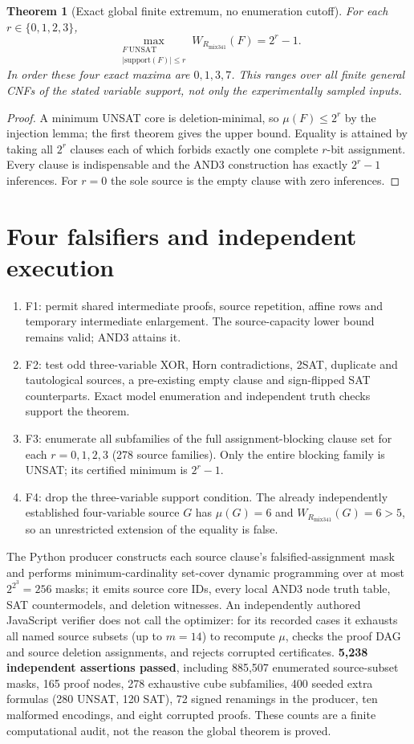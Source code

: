 \documentclass[11pt]{article}
\newtheorem{theorem}{Theorem}
\newcommand{\WR}{W_{R_{\mathrm{mix341}}}}
\begin{document}
\begin{theorem}[Exact global finite extremum, no enumeration cutoff]
For each $r\in\{0,1,2,3\}$,
\[
\boxed{\max_{\substack{F\ \mathrm{UNSAT}\\|\mathrm{support}(F)|\le r}}\WR(F)=2^r-1.}
\]
In order these four exact maxima are $0,1,3,7$. This ranges over all finite general CNFs of the stated variable support, not only the experimentally sampled inputs.
\end{theorem}
\begin{proof}
A minimum UNSAT core is deletion-minimal, so $\mu(F)\le2^r$ by the injection lemma; the first theorem gives the upper bound. Equality is attained by taking all $2^r$ clauses each of which forbids exactly one complete $r$-bit assignment. Every clause is indispensable and the AND3 construction has exactly $2^r-1$ inferences. For $r=0$ the sole source is the empty clause with zero inferences.
\end{proof}

\section{Four falsifiers and independent execution}
\begin{enumerate}
\item[] F1: permit shared intermediate proofs, source repetition, affine rows and temporary intermediate enlargement. The source-capacity lower bound remains valid; AND3 attains it.
\item[] F2: test odd three-variable XOR, Horn contradictions, 2SAT, duplicate and tautological sources, a pre-existing empty clause and sign-flipped SAT counterparts. Exact model enumeration and independent truth checks support the theorem.
\item[] F3: enumerate all subfamilies of the full assignment-blocking clause set for each $r=0,1,2,3$ (278 source families). Only the entire blocking family is UNSAT; its certified minimum is $2^r-1$.
\item[] F4: drop the three-variable support condition. The already independently established four-variable source $G$ has $\mu(G)=6$ and $\WR(G)=6>5$, so an unrestricted extension of the equality is false.
\end{enumerate}

The Python producer constructs each source clause's falsified-assignment mask and performs minimum-cardinality set-cover dynamic programming over at most $2^{2^3}=256$ masks; it emits source core IDs, every local AND3 node truth table, SAT countermodels, and deletion witnesses. An independently authored JavaScript verifier does not call the optimizer: for its recorded cases it exhausts all named source subsets (up to $m=14$) to recompute $\mu$, checks the proof DAG and source deletion assignments, and rejects corrupted certificates. \textbf{5,238 independent assertions passed}, including 885,507 enumerated source-subset masks, 165 proof nodes, 278 exhaustive cube subfamilies, 400 seeded extra formulas (280 UNSAT, 120 SAT), 72 signed renamings in the producer, ten malformed encodings, and eight corrupted proofs. These counts are a finite computational audit, not the reason the global theorem is proved.
\end{document}
